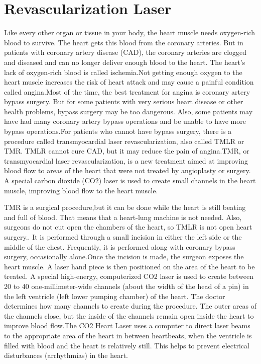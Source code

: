 \documentclass[12pt,A4paper]{article}
\begin{document}
\section{Revascularization Laser}
Like every other organ or tissue in your body, the heart muscle needs oxygen-rich blood to survive. The heart gets this blood from the coronary arteries. But in patients with coronary artery disease (CAD), the coronary arteries are clogged and diseased and can no longer deliver enough blood to the heart. The heart’s lack of oxygen-rich blood is called ischemia.Not getting enough oxygen to the heart muscle increases the risk of heart attack and may cause a painful condition called angina.Most of the time, the best treatment for angina is coronary artery bypass surgery. But for some patients with very serious heart disease or other health problems, bypass surgery may be too dangerous. Also, some patients may have had many coronary artery bypass operations and be unable to have more bypass operations.For patients who cannot have bypass surgery, there is a procedure called transmyocardial laser revascularization, also called TMLR or TMR. TMLR cannot cure CAD, but it may reduce the pain of angina.TMR, or transmyocardial laser revascularization, is a new treatment aimed at improving blood flow to areas of the heart that were not treated by angioplasty or surgery. A special carbon dioxide (CO2) laser is used to create small channels in the heart muscle, improving blood flow to the heart muscle.

TMR is a surgical procedure,but it can be done while the heart is still beating and full of blood. That means that a heart-lung machine is not needed. Also, surgeons do not cut open the chambers of the heart, so TMLR is not open heart surgery.. It is performed through a small incision in either the left side or the middle of the chest. Frequently, it is performed along with coronary bypass surgery, occasionally alone.Once the incision is made, the surgeon exposes the heart muscle. A laser hand piece is then positioned on the area of the heart to be treated. A special high-energy, computerized CO2 laser is used to create between 20 to 40 one-millimeter-wide channels (about the width of the head of a pin) in the left ventricle (left lower pumping chamber) of the heart. The doctor determines how many channels to create during the procedure. The outer areas of the channels close, but the inside of the channels remain open inside the heart to improve blood flow.The CO2 Heart Laser uses a computer to direct laser beams to the appropriate area of the heart in between heartbeats, when the ventricle is filled with blood and the heart is relatively still. This helps to prevent electrical disturbances (arrhythmias) in the heart.
\end{document}
